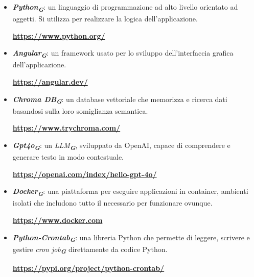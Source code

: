 \begin{itemize}
    \item \textbf{\emph{Python}\textsubscript{\textit{\textbf{G}}}}: un linguaggio di programmazione ad alto livello orientato ad oggetti. Si
    utilizza per realizzare la logica dell’applicazione.
    \begin{center}
        \textbf{\url{https://www.python.org/}}
    \end{center}

    \item \textbf{\emph{Angular}\textsubscript{\textit{\textbf{G}}}}: un framework usato per lo sviluppo dell’interfaccia grafica dell’applicazione.
    \begin{center}
        \textbf{\url{https://angular.dev/}}
    \end{center}
    
    \item \textbf{\emph{Chroma DB}\textsubscript{\textit{\textbf{G}}}}: un database vettoriale che memorizza e ricerca dati basandosi sulla loro somiglianza semantica.
    \begin{center}
        \textbf{\url{https://www.trychroma.com/}}
    \end{center}

    \item \textbf{\emph{Gpt4o}\textsubscript{\textit{\textbf{G}}}}: un \emph{LLM}\textsubscript{\textit{\textbf{G}}}, sviluppato da OpenAI, capace di comprendere e generare testo in modo contestuale.
    \begin{center}
        \textbf{\url{https://openai.com/index/hello-gpt-4o/}}
    \end{center}

    \item \textbf{\emph{Docker}\textsubscript{\textit{\textbf{G}}}}: una piattaforma per eseguire applicazioni in container, ambienti isolati che includono tutto il necessario per funzionare ovunque.
    \begin{center}
        \textbf{\url{https://www.docker.com}}
    \end{center}
    
    \item \textbf{\emph{Python-Crontab}\textsubscript{\textit{\textbf{G}}}}: una libreria Python che permette di leggere, scrivere e gestire {\emph{cron job}\textsubscript{\textit{\textbf{G}}}} direttamente da codice Python.
    \begin{center}
        \textbf{\url{https://pypi.org/project/python-crontab/}}
    \end{center}
   
\end{itemize}


